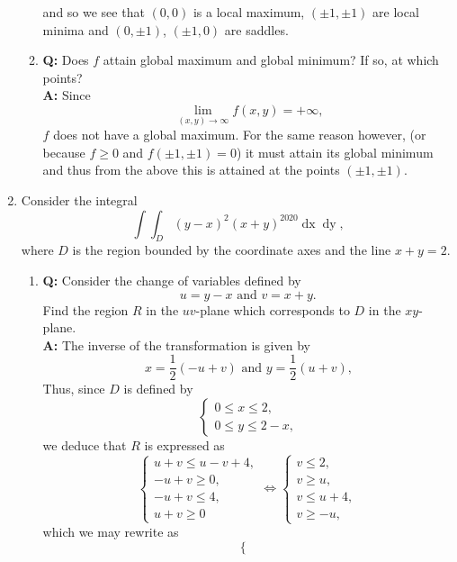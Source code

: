 \documentclass[a4paper,10pt]{article}
\begin{document}
\begin{enumerate}
\begin{enumerate}
        and so we see that $(0, 0)$ is a local maximum, $(\pm 1, \pm 1)$ are local minima and $(0, \pm 1)$, $(\pm 1, 0)$ are saddles.
        \item \textbf{Q:} Does $f$ attain global maximum and global minimum? If so, at which points?\\
        \textbf{A:} Since
        \[\lim_{(x, y) \to \infty} f(x, y) = +\infty \text{,}\]
        $f$ does not have a global maximum.
        For the same reason however, (or because $f \ge 0$ and $f(\pm 1, \pm 1) = 0$) it must attain its global minimum and thus from the above this is attained at the points $(\pm 1, \pm 1)$.
    \end{enumerate}
    \item Consider the integral
    \[\int \int_D (y - x)^2 (x + y)^{2020} \mathop{dx} \mathop{dy} \text{,}\]
    where $D$ is the region bounded by the coordinate axes and the line $x + y = 2$.
    \begin{enumerate}
        \item \textbf{Q:} Consider the change of variables defined by
        \[u = y - x \text{ and } v = x + y \text{.}\]
        Find the region $R$ in the $uv$-plane which corresponds to $D$ in the $xy$-plane.\\
        \textbf{A:} The inverse of the transformation is given by
        \[x = \frac{1}{2} (-u + v) \text{ and } y = \frac{1}{2} (u + v) \text{,}\]
        Thus, since $D$ is defined by
        \[
        \begin{cases}
            0 \le x \le 2,\\
            0 \le y \le 2 - x \text{,}
        \end{cases}
        \]
        we deduce that $R$ is expressed as
        \[
        \begin{cases}
            u + v \le u - v + 4,\\
            -u + v \ge 0,\\
            -u + v \le 4,\\
            u + v \ge 0
        \end{cases}
        \iff
        \begin{cases}
            v \le 2,\\
            v \ge u,\\
            v \le u + 4,\\
            v \ge -u \text{,}
        \end{cases}
        \]
        which we may rewrite as
        \[
        \begin{cases}

\end{cases}\]
\end{enumerate}
\end{enumerate}
\end{document}
